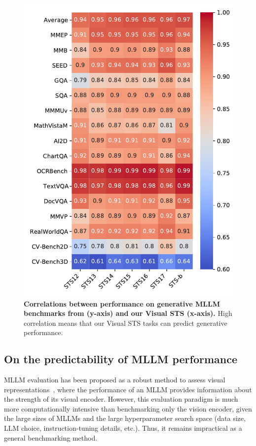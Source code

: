 \begin{figure}
\centering
\includegraphics[width=\linewidth]{figures/correlation_small.pdf}
\caption{\textbf{Correlations between performance on generative MLLM benchmarks from \citet{tong2024cambrian} (y-axis) and our Visual STS (x-axis).} High correlation means that our Visual STS tasks can predict generative performance.}
\label{fig:correlation small}
\end{figure}

\subsection{On the predictability of MLLM performance}

MLLM evaluation has been proposed as a robust method to assess visual representations~\citep{tong2024cambrian}, where the performance of an MLLM provides information about the strength of its visual encoder. However, this evaluation paradigm is much more computationally intensive than benchmarking only the vision encoder, given the large sizes of MLLMs and the large hyperparameter search space (data size, LLM choice, instruction-tuning details, etc.). Thus, it remains impractical as a general benchmarking method.

